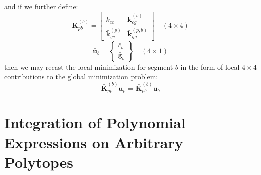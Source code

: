 \documentclass[11pt]{article} %
\begin{document}
and if we further define:
\begin{equation}
	\bar{\mathbf{K}}_{pb}^{(b)} = \left[ \begin{array}{cc} \bar{k}_{cc} & \bar{\mathbf{k}}_{cg}^{(b)} \\ \bar{\mathbf{k}}_{gc}^{(p)} & \bar{\mathbf{k}}_{gg}^{(p,b)} \end{array} \right] \quad (4 \times 4)
\end{equation}
\begin{equation}
	\bar{\mathbf{u}}_b = \left\{ \begin{array}{c} \bar{c}_b \\ \bar{\mathbf{g}}_b \end{array} \right\} \quad (4 \times 1)
\end{equation}
then we may recast the local minimization for segment $b$ in the form of local $4\times4$ contributions to the global minimization problem:
\begin{equation}
	\bar{\mathbf{K}}_{pp}^{(b)} \mathbf{u}_p = \bar{\mathbf{K}}_{pb}^{(b)} \bar{\mathbf{u}}_b
\end{equation}

\newpage

\section{Integration of Polynomial Expressions on Arbitrary Polytopes}
\end{document}
